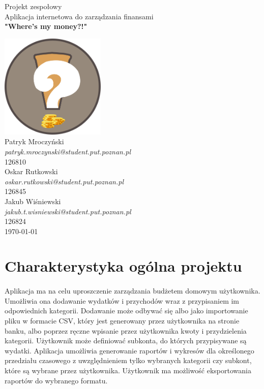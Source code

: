 \documentclass{article}
\begin{document}
	
		\begin{titlepage}
		\centering
		
		 \Huge{
		 	\indexspace Projekt zespołowy \\ 
		 	\indexspace Aplikacja internetowa do zarządzania finansami \\[1cm]
		 	\indexspace \textbf{"Where's my money?!"\\[1cm]}}
		
		\includegraphics[width=5cm]{assets/logo.png}\\[1cm]
		\Large{Patryk Mroczyński \\ \textlangle{}\textit{patryk.mroczynski@student.put.poznan.pl}\textrangle{} \\126810\\
		Oskar Rutkowski \\ \textlangle{}\textit{oskar.rutkowski@student.put.poznan.pl}\textrangle{} \\126845 \\
		Jakub Wiśniewski \\ \textlangle{}\textit{jakub.t.wisniewski@student.put.poznan.pl}\textrangle{} \\126824 \\[0.5cm]}
	\today
		
	\end{titlepage}
	\newpage
	\tableofcontents
	\newpage

	\section{Charakterystyka ogólna projektu}
	\paragraph{} Aplikacja ma na celu uproszczenie zarządzania budżetem domowym użytkownika. Umożliwia ona dodawanie wydatków i przychodów wraz z przypisaniem im odpowiednich kategorii. Dodawanie może odbywać się albo jako importowanie pliku w formacie CSV, który jest generowany przez użytkownika na stronie banku, albo poprzez ręczne wpisanie przez użytkownika kwoty i przydzielenia kategorii. Użytkownik może definiować subkonta, do których przypisywane są wydatki. Aplikacja umożliwia generowanie raportów i wykresów dla określonego przedziału czasowego z uwzględnieniem tylko wybranych kategorii czy subkont, które są wybrane przez użytkownika. Użytkownik ma możliwość eksportowania raportów do wybranego formatu.
\end{document}
